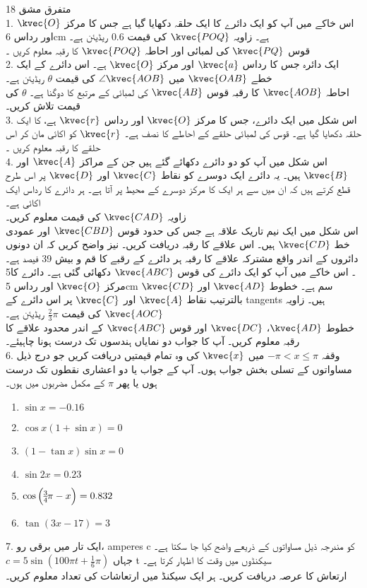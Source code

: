 متفرق مشق 18 \\
1. اس خاکے میں آپ کو ایک دائرے کا ایک حلقہ دکھایا گیا ہے جس کا مرکز
\( \kvec{O}\) 
اور رداس
6cm
ہے۔ زاویہ 
\(\kvec{POQ}\)
کی قیمت
0.6
ریڈیئن ہے۔\\
قوس
\(\kvec{PQ}\)
کی لمبائی اور احاطہ
\(\kvec{POQ}\)
کا رقبہ معلوم کریں ۔\\
2. ایک دائرہ جس کا رداس
\(\kvec{a}\)
اور مرکز
\( \kvec{O}\)
ہے۔ اس دائرے کے ایک خطے
\(\kvec{OAB}\)
میں
\(\angle \kvec{AOB}\)
کی قیمت
\(\theta\)
ریڈیئن ہے۔\\
احاطہ
\( \kvec{AOB}\)
کا رقبہ قوس
\(\kvec{AB}\)
کی لمبائی کے مرتبع کا دوگنا ہے۔
\(\theta\)
کی قیمت تلاش کریں۔\\
3. اس شکل میں ایک دائرے، جس کا مرکز
\( \kvec{O}\)
اور رداس
\( \kvec{r}\)
ہے، کا ایک حلقہ دکھایا گیا ہے۔ قوس کی لمبائی حلقے کے احاطے کا نصف ہے۔
\( \kvec{r}\)
کو اکائی مان کر اس حلقے کا رقبہ معلوم کریں ۔\\
4. اس شکل میں آپ کو دو دائرے دکھائے گئے ہیں جن کے مراکز
\(\kvec{A}\)
اور
\(\kvec{B}\)
ہیں۔ یہ دائرے ایک دوسرے کو نقاط
\(\kvec{C}\)
اور
\(\kvec{D}\)
پر اس طرح قطع کرتے ہیں کہ ان میں سے ہر ایک کا مرکز دوسرے کے محیط پر آتا ہے۔ ہر دائرے کا رداس ایک اکائی ہے۔\\
زاویہ 
\(\kvec{CAD}\)
کی قیمت معلوم کریں۔\\
اس شکل میں ایک نیم تاریک علاقہ ہے جس کی حدود قوس
\(\kvec{CBD}\)
اور عمودی خط
\(\kvec{CD}\)
ہیں۔
اس علاقے کا رقبہ دریافت کریں۔
نیز واضح کریں کہ ان دونوں دائروں کے اندر واقع مشترکہ علاقے کا رقبہ ہر دائرے کے رقبے کا قم و بیش
39
فیصد ہے۔\\
5۔ اس خاکے میں آپ کو ایک دائرے کی قوس 
\( \kvec{ABC}\)
دکھائی گئی ہے۔ دائرے کا مرکز
\( \kvec{O}\)
اور رداس
5cm
سم ہے۔ خطوط
\( \kvec{AD}\)
اور
\( \kvec{CD}\)
بالترتیب نقاط
\( \kvec{A}\)
اور
\( \kvec{C}\)
پر اس دائرے کے tangents ہیں۔ زاویہ
\( \kvec{AOC}\)
کی قیمت
\(\frac{2}{3} \pi\)
ریڈیئن ہے۔\\
خطوط
\( \kvec{AD}\)،
\( \kvec{DC}\)
اور قوس
\( \kvec{ABC}\)
کے اندر محدود علاقے کا رقبہ معلوم کریں۔ آپ کا جواب دو نمایاں ہندسوں تک درست ہونا چاہیئے۔\\
6. وقفہ
\(-\pi<x\le\pi\)
میں
\( \kvec{x}\)
کی وہ تمام قیمتیں دریافت کریں جو درج ذیل مساواتوں کے تسلی بخش جواب ہوں۔ آپ کے جواب یا دو اعشاری نقطوں تک درست ہوں یا پھر
\(\pi\)
کے مکمل مضربوں میں ہوں۔
\begin{enumerate}
\item \(\sin{x}=-0.16\)
\item \(\cos{x} (1+\sin{x})=0\)
\item \((1-\tan{x})\sin{x}=0\)
\item \(\sin{2x}=0.23\)
\item \(\cos\Big{(\frac{3}{4}\pi-x}\Big)=0.832\)
\item \(\tan(3x-17)=3\)
\end{enumerate}
7. ایک تار میں برقی رو، amperes c کو مندرجہ ذیل مساواتوں کے ذریعے واضح کیا جا سکتا ہے۔\\
\(c=5\sin(100\pi t+\frac{1}{6}\pi)\)
جہاں t سیکنڈوں میں وقت کا اظہار کرتا ہے۔\\
ارتعاش کا عرصہ دریافت کریں۔ ہر ایک سیکنڈ میں ارتعاشات کی تعداد معلوم کریں۔\\




